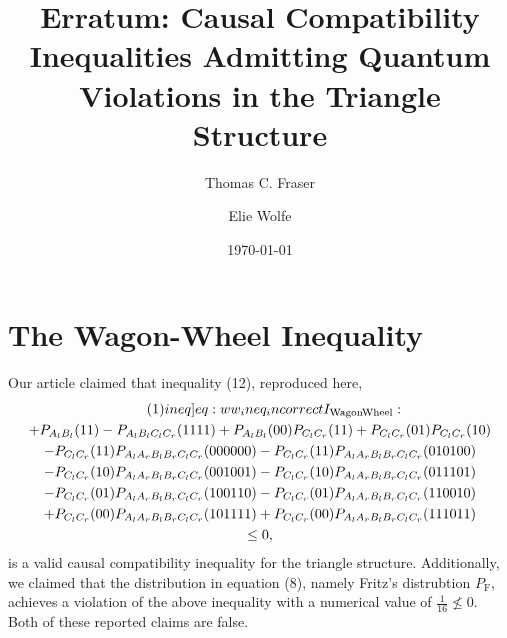 \documentclass[aps, 10pt, english, twoside, pra, nofootinbib, tightenlines, longbibliography, superscriptaddress, notitlepage]{revtex4-1}
\begin{document}
    \title{Erratum: Causal Compatibility Inequalities Admitting Quantum Violations in the Triangle Structure}
    \author{Thomas C. Fraser}
    \author{Elie Wolfe}
    \date{\today}
    \maketitle
    \section{The Wagon-Wheel Inequality}
    Our article claimed that inequality (12), reproduced here,
    \begin{equation*}
    \begin{gathered}
        \eq\label[ineq]{eq:ww_ineq_incorrect}
        I\tsb{WagonWheel} : \\
        +P_{A_{l}B_{l}}(11) -P_{A_{l}B_{l}C_{l}C_{r}}(1111) +P_{A_{l}B_{l}}(00) P_{C_{l}C_{r}}(11) +P_{C_{l}C_{r}}(01) P_{C_{l}C_{r}}(10) \\
        -P_{C_{l}C_{r}}(11) P_{A_{l}A_{r}B_{l}B_{r}C_{l}C_{r}}(000000) -P_{C_{l}C_{r}}(11) P_{A_{l}A_{r}B_{l}B_{r}C_{l}C_{r}}(010100) \\
        -P_{C_{l}C_{r}}(10) P_{A_{l}A_{r}B_{l}B_{r}C_{l}C_{r}}(001001) -P_{C_{l}C_{r}}(10) P_{A_{l}A_{r}B_{l}B_{r}C_{l}C_{r}}(011101) \\
        -P_{C_{l}C_{r}}(01) P_{A_{l}A_{r}B_{l}B_{r}C_{l}C_{r}}(100110) -P_{C_{l}C_{r}}(01) P_{A_{l}A_{r}B_{l}B_{r}C_{l}C_{r}}(110010) \\
        +P_{C_{l}C_{r}}(00) P_{A_{l}A_{r}B_{l}B_{r}C_{l}C_{r}}(101111) +P_{C_{l}C_{r}}(00) P_{A_{l}A_{r}B_{l}B_{r}C_{l}C_{r}}(111011) \\
        \leq 0,
    \end{gathered}
    \end{equation*}
    is a valid causal compatibility inequality for the triangle structure. Additionally, we claimed that the distribution in equation (8), namely Fritz's distrubtion $P_{\text{F}}$, achieves a violation of the above inequality with a numerical value of $\frac{1}{16} \not\leq 0$. Both of these reported claims are false. 
\end{document}
